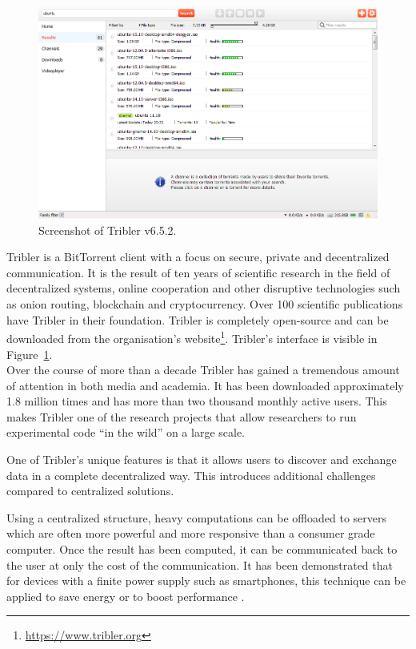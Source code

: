\begin{figure}[!h]
	\centering
	\includegraphics[width=\linewidth]{introduction/images/tribler_screenshot.png}
	\caption{Screenshot of Tribler v6.5.2.}
	\label{fig:tribler_screenshot}
\end{figure}

Tribler is a BitTorrent client with a focus on secure, private and decentralized communication.
It is the result of ten years of scientific research in the field of decentralized systems, online cooperation and other disruptive technologies such as onion routing, blockchain and cryptocurrency.
Over 100 scientific publications have Tribler in their foundation.
Tribler is completely open-source and can be downloaded from the organisation's website\footnote{\url{https://www.tribler.org}}.
Tribler's interface is visible in Figure~\ref{fig:tribler_screenshot}.\\
Over the course of more than a decade Tribler has gained a tremendous amount of attention in both media and academia.
It has been downloaded approximately 1.8 million times \cite{github2016releases} and has more than two thousand monthly active users.
This makes Tribler one of the research projects that allow researchers to run experimental code \enquote{in the wild} on a large scale.

One of Tribler's unique features is that it allows users to discover and exchange data in a complete decentralized way.
This introduces additional challenges compared to centralized solutions.

Using a centralized structure, heavy computations can be offloaded to servers which are often more powerful and more responsive than a consumer grade computer.
Once the result has been computed, it can be communicated back to the user at only the cost of the communication. 
It has been demonstrated that for devices with a finite power supply such as smartphones, this technique can be applied to save energy or to boost performance \cite{kumar2010cloud, kemp2010cuckoo}.

